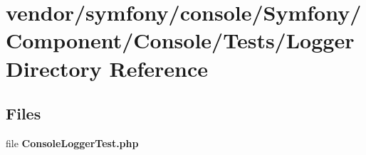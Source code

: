 \section{vendor/symfony/console/\+Symfony/\+Component/\+Console/\+Tests/\+Logger Directory Reference}
\label{dir_6ca2f143835b8364fe8041620913c760}
\subsection*{Files}
\begin{DoxyCompactItemize}
\item 
file {\bf Console\+Logger\+Test.\+php}
\end{DoxyCompactItemize}
